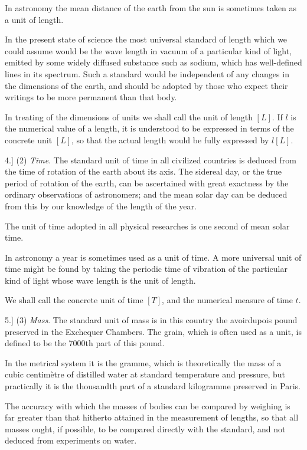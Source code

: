 \documentclass[11pt,a4paper]{article}
\begin{document}
In astronomy the mean distance of the earth from the sun is sometimes
taken as a unit of length.

In the present state of science the most universal standard of length
which we could assume would be the wave length in vacuum of a particular
kind of light, emitted by some widely diffused substance such as sodium,
which has well-defined lines in its spectrum. Such a standard would be
independent of any changes in the dimensions of the earth, and should be
adopted by those who expect their writings to be more permanent than
that body.

In treating of the dimensions of units we shall call the unit of length
\([L]\). If \(l\) is the numerical value of a length, it is understood
to be expressed in terms of the concrete unit \([L]\), so that the actual
length would be fully expressed by \(l[L]\).

4.] (2) \textit{Time}. The standard unit of time in all civilized
countries is deduced from the time of rotation of the earth about its
axis. The sidereal day, or the true period of rotation of the earth, can
be ascertained with great exactness by the ordinary observations of
astronomers; and the mean solar day can be deduced from this by our
knowledge of the length of the year.

The unit of time adopted in all physical researches is one second of mean
solar time.

In astronomy a year is sometimes used as a unit of time. A more universal
unit of time might be found by taking the periodic time of vibration of
the particular kind of light whose wave length is the unit of length.

We shall call the concrete unit of time \([T]\), and the numerical
measure of time \(t\).

5.] (3) \textit{Mass}. The standard unit of mass is in this country the
avoirdupois pound preserved in the Exchequer Chambers. The grain, which
is often used as a unit, is defined to be the 7000th part of this pound.

In the metrical system it is the gramme, which is theoretically the mass
of a cubic centimètre of distilled water at standard temperature and
pressure, but practically it is the thousandth part of a standard
kilogramme preserved in Paris.

The accuracy with which the masses of bodies can be compared by weighing
is far greater than that hitherto attained in the measurement of lengths,
so that all masses ought, if possible, to be compared directly with the
standard, and not deduced from experiments on water.
\end{document}
